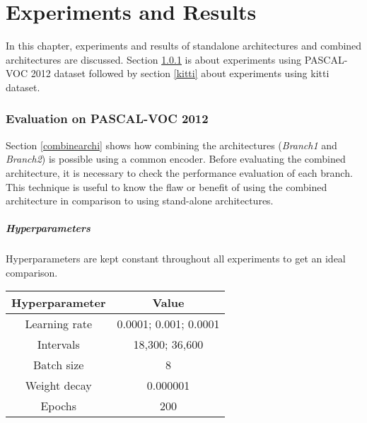 \lhead{\thepage}

\chapter{Experiments and Results}

In this chapter, experiments and results of standalone architectures and combined architectures are discussed. Section \ref{pascalvoc} is about experiments using PASCAL-VOC 2012 dataset followed by section \ref{kitti} about experiments using \ac{kitti} dataset.

\subsection{Evaluation on PASCAL-VOC 2012} \label{pascalvoc}

Section \ref{combinearchi} shows how combining the architectures (\textit{Branch1} and \textit{Branch2}) is possible using a common encoder. Before evaluating the combined architecture, it is necessary to check the performance evaluation of each branch. This technique is useful to know the flaw or benefit of using the combined architecture in comparison to using stand-alone architectures.

\par

\paragraph{Hyperparameters}

Hyperparameters are kept constant throughout all experiments to get an ideal comparison. 

\begin{table}[h!]
\centering
\begin{tabular}{|c|c|}
\hline
\textbf{Hyperparameter} & \textbf{Value}                 \\ \hline
Learning rate  & 0.0001; 0.001; 0.0001 \\ \hline
Intervals      & 18,300; 36,600        \\ \hline
Batch size     & 8                     \\ \hline
Weight decay   & 0.000001              \\ \hline
Epochs         & 200                   \\ \hline
\end{tabular}
\end{table}

